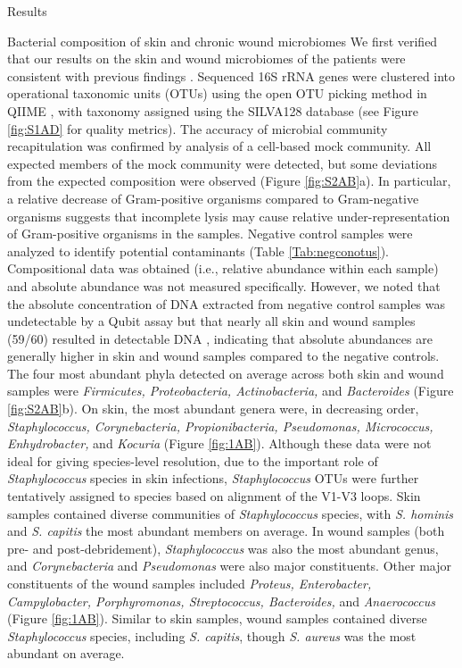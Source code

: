 \documentclass[oneside,12pt,final]{sty/ucthesis-CA2012}
\begin{document}
\begin{mainmatter}
\begin{section}{Results}
\begin{subsection}{Bacterial composition of skin and chronic wound microbiomes}
We first verified that our results on the skin and wound microbiomes of the patients were consistent with previous findings \cite{RN8, RN21}. Sequenced 16S rRNA genes were clustered into operational taxonomic units (OTUs) using the open OTU picking method in QIIME \cite{RN81}, with taxonomy assigned using the SILVA128 database \cite{RN35} (see Figure \ref{fig:S1AD} for quality metrics). The accuracy of microbial community recapitulation was confirmed by analysis of a cell-based mock community. All expected members of the mock community were detected, but some deviations from the expected composition were observed (Figure \ref{fig:S2AB}a). In particular, a relative decrease of Gram-positive organisms compared to Gram-negative organisms suggests that incomplete lysis may cause relative under-representation of Gram-positive organisms in the samples. Negative control samples were analyzed to identify potential contaminants (Table \ref{Tab:negconotus}). Compositional data was obtained (i.e., relative abundance within each sample) and absolute abundance was not measured specifically. However, we noted that the absolute concentration of DNA extracted from negative control samples was undetectable by a Qubit assay but that nearly all skin and wound samples (59/60) resulted in detectable DNA \cite{RN41}, indicating that absolute abundances are generally higher in skin and wound samples compared to the negative controls. The four most abundant phyla detected on average across both skin and wound samples were \textit{Firmicutes, Proteobacteria, Actinobacteria,} and \textit{Bacteroides} (Figure \ref{fig:S2AB}b). On skin, the most abundant genera were, in decreasing order, \textit{Staphylococcus, Corynebacteria, Propionibacteria, Pseudomonas, Micrococcus, Enhydrobacter,} and \textit{Kocuria} (Figure \ref{fig:1AB}). Although these data were not ideal for giving species-level resolution, due to the important role of \textit{Staphylococcus} species in skin infections, \textit{Staphylococcus} OTUs were further tentatively assigned to species based on alignment of the V1-V3 loops. Skin samples contained diverse communities of \textit{Staphylococcus} species, with \textit{S. hominis} and \textit{S. capitis} the most abundant members on average. In wound samples (both pre- and post-debridement), \textit{Staphylococcus} was also the most abundant genus, and \textit{Corynebacteria} and \textit{Pseudomonas} were also major constituents. Other major constituents of the wound samples included \textit{Proteus, Enterobacter, Campylobacter, Porphyromonas, Streptococcus, Bacteroides,} and \textit{Anaerococcus} (Figure \ref{fig:1AB}). Similar to skin samples, wound samples contained diverse \textit{Staphylococcus} species, including \textit{S. capitis}, though \textit{S. aureus} was the most abundant on average. 
 

\end{subsection}
\end{section}
\end{mainmatter}
\end{document}

